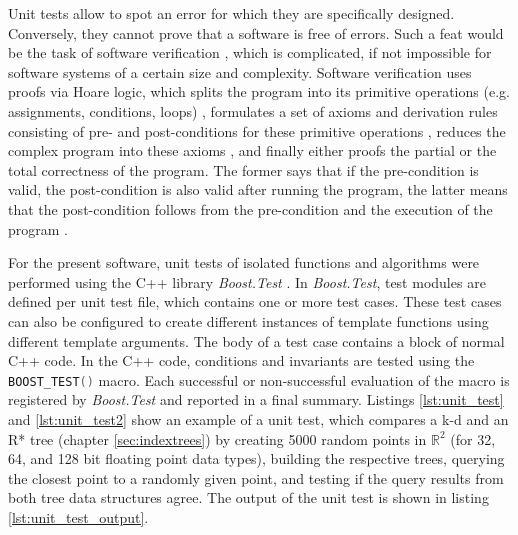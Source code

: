 Unit tests allow to spot an error for which they are specifically designed. Conversely, they cannot 
prove that a software is free of errors. Such a feat would be the task of software
verification \cite[Ch. 5, pp. 117-144]{Berghammer2017}, which is complicated, if not impossible for
software systems of a certain size and complexity.
Software verification uses proofs via Hoare logic, which splits the program into its primitive
operations (e.g. assignments, conditions, loops) \cite[pp. 118-119]{Berghammer2017}, formulates
a set of axioms and derivation rules consisting of pre- and post-conditions for these primitive operations
\cite[pp. 122]{Berghammer2017}, reduces the complex program into these axioms \cite[pp. 123]{Berghammer2017},
and finally either proofs the partial or the total correctness of the program.
The former says that if the pre-condition is valid, the post-condition is also valid after running the
program, the latter means that the post-condition follows from the pre-condition and the execution
of the program \cite[pp. 121]{Berghammer2017}.

For the present software, unit tests of isolated functions and algorithms were performed using the 
C++ library \textit{Boost.Test} \cite{web_boost_test}.
In \textit{Boost.Test}, test modules are defined per unit test file, which contains one or more test cases.
These test cases can also be configured to create different instances of template functions using
different template arguments. The body of a test case contains a block of normal C++ code.
In the C++ code, conditions and invariants are tested using the 
\lstinline[language=C++]|BOOST_TEST()| macro. Each successful or non-successful evaluation
of the macro is registered by \textit{Boost.Test} and reported in a final summary.
Listings \ref{lst:unit_test} and \ref{lst:unit_test2} show an example of a unit test, which compares
a k-d and an R* tree (chapter \ref{sec:indextrees}) by creating 5000 random points in $\mathbb{R}^2$
(for 32, 64, and 128 bit floating point data types), 
building the respective trees, querying the closest point to a randomly given point, 
and testing if the query results from both tree data structures agree. 
The output of the unit test is shown in listing \ref{lst:unit_test_output}.

